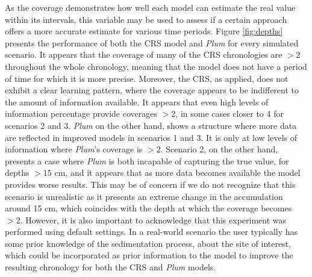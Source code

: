 \documentclass [10pt] {article}
\begin{document}
As the coverage demonstrates how well each model can estimate the real value within its intervals, this variable may be used to assess if a certain approach offers a more accurate estimate for various time periods.
Figure \ref{fig:depths} presents the performance of both the CRS model and \textit{Plum} for every simulated scenario.
It appears that the coverage of many of the CRS chronologies are $> 2$ throughout the whole chronology, meaning that the model does not have a period of time for which it is more precise. 
Moreover, the CRS, as applied, does not exhibit a clear learning pattern, where the coverage appears to be indifferent to the amount of information available.
It appears that even high levels of information percentage provide coverages $> 2$, in some cases closer to 4 for scenarios 2 and 3.
\textit{Plum} on the other hand, shows a structure where more data are reflected in improved models in scenarios 1 and 3.
It is only at low levels of information where \textit{Plum}'s coverage is $>2$.
Scenario 2, on the other hand, presents a case where \textit{Plum} is both incapable of capturing the true value, for depths $>15$ cm, and it appears that as more data becomes available the model provides worse results. 
This may be of concern if we do not recognize that this scenario is unrealistic as it presents an extreme change in the accumulation around 15 cm, which coincides with the depth at which the coverage becomes $>2$.
However, it is also important to acknowledge that this experiment was performed using default settings.  
In a real-world scenario the user typically has some prior knowledge of the sedimentation process, about the site of interest, which could be incorporated as prior information to the model to improve the resulting chronology for both the CRS and \textit{Plum} models.

\end{document}
